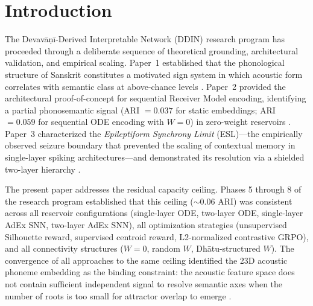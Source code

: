 \documentclass{article}
\begin{document}
\begin{abstract}
We further report that AdEx dynamics require GPU float32 precision for optimal biophysical fidelity. CPU computation produces ARI = 0.8654, representing ~0.09 degradation attributable to accumulated floating-point error in the BCM threshold adaptation. This numerical sensitivity is consistent with the system operating near the criticality threshold, where small perturbations produce large changes in representational structure.

\smallskip
\noindent\textbf{Keywords:} semantic pressure, zero-shot generalization, DDIN,
AdEx homeostasis, Dhātupāṭha scaling, phonosemantics, embodied cognition,
neuromorphic computing
\end{abstract}

\section{Introduction}

The Devavāṇī-Derived Interpretable Network (DDIN) research program has proceeded
through a deliberate sequence of theoretical grounding, architectural validation, and
empirical scaling. Paper~1 established that the phonological structure of Sanskrit
constitutes a motivated sign system in which acoustic form correlates with semantic
class at above-chance levels \citep{kumar2026phonosemantic}. Paper~2 provided the
architectural proof-of-concept for sequential Receiver Model encoding, identifying a
partial phonosemantic signal (ARI $= 0.037$ for static embeddings; ARI $= 0.059$ for
sequential ODE encoding with $W=0$) in zero-weight reservoirs \citep{kumar2026ddin}.
Paper~3 characterized the \textit{Epileptiform Synchrony Limit} (ESL)---the
empirically observed seizure boundary that prevented the scaling of contextual memory in
single-layer spiking architectures---and demonstrated its resolution via a shielded
two-layer hierarchy \citep{kumar2026esl}.

The present paper addresses the residual capacity ceiling. Phases 5 through 8 of the
research program established that this ceiling (${\sim}0.06$ ARI) was consistent across
all reservoir configurations (single-layer ODE, two-layer ODE, single-layer AdEx SNN,
two-layer AdEx SNN), all optimization strategies (unsupervised Silhouette reward,
supervised centroid reward, L2-normalized contrastive GRPO), and all connectivity
structures ($W=0$, random $W$, Dhātu-structured $W$). The convergence of all approaches
to the same ceiling identified the 23D acoustic phoneme embedding as the binding
constraint: the acoustic feature space does not contain sufficient independent signal to
resolve semantic axes when the number of roots is too small for attractor overlap to
emerge \citep{bellman1961curse,gardner1988}.
\end{document}

